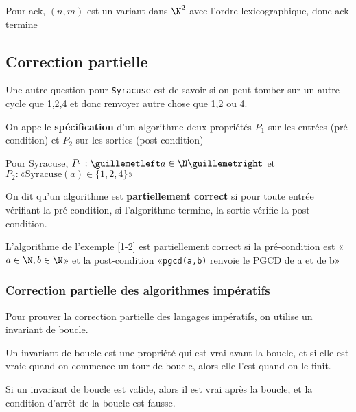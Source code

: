 \begin{example}
	Pour ack, $(n,m)$ est un variant dans $\N^2$ avec l'ordre lexicographique, donc ack termine
\end{example}

\subsection{Correction partielle}

Une autre question pour \texttt{Syracuse} est de savoir si on peut tomber sur un autre cycle que 1,2,4 et donc renvoyer autre chose que 1,2 ou 4.

\begin{definition}
	On appelle \textbf{spécification} d'un algorithme deux propriétés $P_1$ sur les entrées (pré-condition) et $P_2$ sur les sorties (post-condition)
\end{definition}

\begin{example}
	Pour Syracuse, $P_1 : «a\in \N»$ et $P_2 : «\text{Syracuse}(a) \in \{1,2,4\}»$
\end{example}

\begin{definition}
	On dit qu'un algorithme est \textbf{partiellement correct} si pour toute entrée vérifiant la pré-condition, si l'algorithme termine, la sortie vérifie la post-condition.
\end{definition}

\begin{example}
	L'algorithme de l'exemple \ref{1-2} est partiellement correct si la pré-condition est «$a\in \N, b \in \N$» et la post-condition «\texttt{pgcd(a,b)} renvoie le PGCD de a et de b» \label{1-3}
\end{example}

\subsubsection{Correction partielle des algorithmes impératifs}

Pour prouver la correction partielle des langages impératifs, on utilise un invariant de boucle.

\begin{definition}
	Un invariant de boucle est une propriété qui est vrai avant la boucle, et si elle est vraie quand on commence un tour de boucle, alors elle l'est quand on le finit.
\end{definition}

\begin{proposition}
	Si un invariant de boucle est valide, alors il est vrai après la boucle, et la condition d'arrêt de la boucle est fausse.
\end{proposition}

